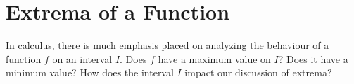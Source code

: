 \section{Extrema of a Function}\label{sec:ExtremaSection}
In calculus, there is much emphasis placed on analyzing the behaviour
of a function $f$ on an interval $I$. Does $f$ have a maximum value on $I$?
Does it have a minimum value? How does the interval $I$ impact our discussion
of extrema?






